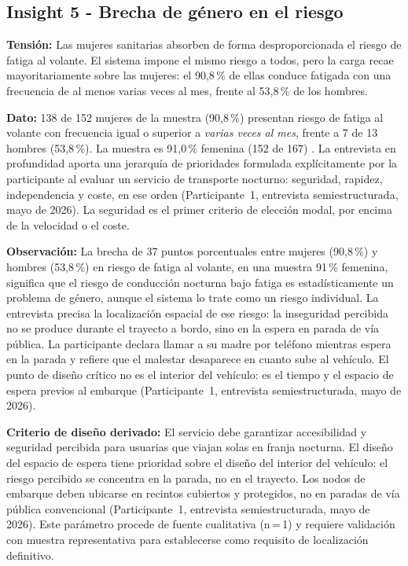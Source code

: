 
\subsection*{Insight 5 - Brecha de género en el riesgo}
\label{sec:insight-5}

\textbf{Tensión:} Las mujeres sanitarias absorben de forma
desproporcionada el riesgo de fatiga al volante. El sistema
impone el mismo riesgo a todos, pero la carga recae
mayoritariamente sobre las mujeres: el 90{,}8\,\% de ellas
conduce fatigada con una frecuencia de al menos varias veces
al mes, frente al 53{,}8\,\% de los hombres.

\textbf{Dato:} 138 de 152 mujeres de la muestra (90{,}8\,\%)
presentan riesgo de fatiga al volante con frecuencia igual o
superior a \emph{varias veces al mes}, frente a 7 de 13 hombres
(53{,}8\,\%). La muestra es 91{,}0\,\% femenina (152 de 167)
\parencite{LouridoRegueira2026}. La entrevista en profundidad
aporta una jerarquía de prioridades formulada explícitamente
por la participante al evaluar un servicio de transporte
nocturno: seguridad, rapidez, independencia y coste, en ese
orden (Participante~1, entrevista semiestructurada, mayo de 2026).
La seguridad es el primer criterio de elección modal, por encima
de la velocidad o el coste.

\textbf{Observación:} La brecha de 37 puntos porcentuales entre
mujeres (90{,}8\,\%) y hombres (53{,}8\,\%) en riesgo de fatiga
al volante, en una muestra 91\,\% femenina, significa que el
riesgo de conducción nocturna bajo fatiga es estadísticamente
un problema de género, aunque el sistema lo trate como un riesgo
individual. La entrevista precisa la localización espacial de
ese riesgo: la inseguridad percibida no se produce durante el
trayecto a bordo, sino en la espera en parada de vía pública.
La participante declara llamar a su madre por teléfono mientras
espera en la parada y refiere que el malestar desaparece en
cuanto sube al vehículo. El punto de diseño crítico no es el
interior del vehículo: es el tiempo y el espacio de espera
previos al embarque (Participante~1, entrevista semiestructurada,
mayo de 2026).

\textbf{Criterio de diseño derivado:} El servicio debe garantizar
accesibilidad y seguridad percibida para usuarias que viajan
solas en franja nocturna. El diseño del espacio de espera tiene
prioridad sobre el diseño del interior del vehículo: el riesgo
percibido se concentra en la parada, no en el trayecto. Los
nodos de embarque deben ubicarse en recintos cubiertos y
protegidos, no en paradas de vía pública convencional
(Participante~1, entrevista semiestructurada, mayo de 2026).
Este parámetro procede de fuente cualitativa (n\,=\,1) y
requiere validación con muestra representativa para establecerse
como requisito de localización definitivo.
